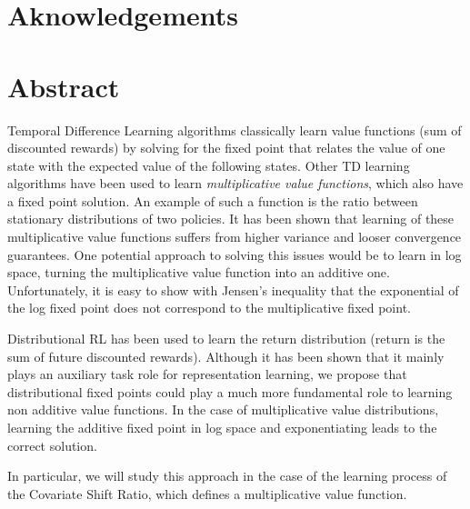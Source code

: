 \documentclass[12pt,a4paper,openright,twoside]{article}
\numberwithin{equation}{section}
\theoremstyle{definition}
\theoremstyle{remark}
\theoremstyle{plain}
\begin{document}
\newpage
{} 

\newpage 


\section*{Aknowledgements}

\newpage


\section*{Abstract}

Temporal Difference Learning algorithms classically learn value functions (sum of discounted rewards) by solving for the fixed point that relates the value of one state with the expected value of the following states. Other TD learning algorithms have been used to learn \textit{multiplicative value functions}, which also have a fixed point solution. An example of such a function is the ratio between stationary distributions of two policies. It has been shown that learning of these multiplicative value functions suffers from higher variance and looser convergence guarantees. One potential approach to solving this issues would be to learn in log space, turning the multiplicative value function into an additive one. Unfortunately, it is easy to show with Jensen's inequality that the exponential of the log fixed point does not correspond to the multiplicative fixed point.

Distributional RL has been used to learn the return distribution (return is the sum of future discounted rewards). Although it has been shown that it mainly plays an auxiliary task role for representation learning, we propose that distributional fixed points could play a much more fundamental role to learning non additive value functions. In the case of multiplicative value distributions, learning the additive fixed point in log space and exponentiating leads to the correct solution.

In particular, we will study this approach in the case of the learning process of the Covariate Shift Ratio, which defines a multiplicative value function.





\newpage

\tableofcontents

\newpage


\pagestyle{fancy}
\renewcommand{\sectionmark}[1]{\markboth{\thesection.\quad #1}{}}
\renewcommand{\subsectionmark}[1]{\markright{\thesubsection.\quad #1}}
\end{document}

